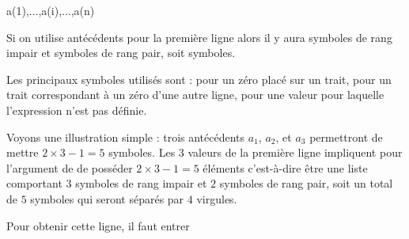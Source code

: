 \begin{tkzltxexample}[]
            { a(1),...,a(i),...,a(n)} %
\end{tkzltxexample}


\medskip
Si on utilise  antécédents pour la première ligne alors il y aura  symboles de rang impair et  symboles de rang pair, soit  symboles.

 Les principaux symboles  utilisés sont :  pour un zéro placé sur un trait,  pour un trait correspondant  à un zéro d'une autre ligne,  pour une valeur pour laquelle l'expression n'est pas définie.

Voyons une illustration  simple : trois antécédents $a_1$, $a_2$, et $a_3$ permettront de mettre $2\times3 -1 =5$ symboles. Les $3$ valeurs de la première ligne impliquent pour l'argument de    de posséder {$2\times 3-1=5$} éléments  c'est-à-dire être une liste comportant   $3$ symboles de rang impair et $2$ symboles de rang pair, soit un total de $5$ symboles qui seront séparés par $4$ virgules.

\begin{center}
\end{center}

Pour obtenir cette ligne, il faut entrer
\begin{tkzexample}
\end{tkzexample}





